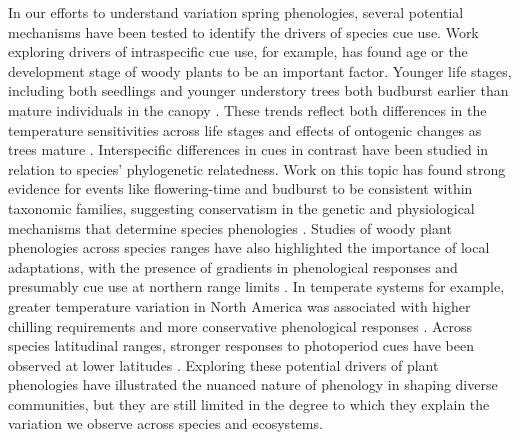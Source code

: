 \documentclass{article}\usepackage[]{graphicx}\usepackage[]{color}
\begin{document}
In our efforts to understand variation spring phenologies, several potential mechanisms have been tested to identify the drivers of species cue use. Work exploring drivers of intraspecific cue use, for example, has found age or the development stage of woody plants to be an important factor. Younger life stages, including both seedlings and younger understory trees both budburst earlier than mature individuals in the canopy \citep{Vitasse2013,Seiwa1991}. These trends reflect both differences in the temperature sensitivities across life stages and effects of ontogenic changes as trees mature \citep{Vitasse2013,Seiwa1991}. Interspecific differences in cues in contrast have been studied in relation to species' phylogenetic relatedness. Work on this topic has found strong evidence for events like flowering-time and budburst to be consistent within taxonomic families, suggesting conservatism in the genetic and physiological mechanisms that determine species phenologies \citep{Kochmer1986,Davies2013,Gougherty2018}. Studies of woody plant phenologies across species ranges have also highlighted the importance of local adaptations, with the presence of gradients in phenological responses and presumably cue use at northern range limits \citep{Lechowicz1984,Chuine2001,Chuine2010}. In temperate systems for example, greater temperature variation in North America was associated with higher chilling requirements and more conservative phenological responses \citep{Zohner2017}.  Across species latitudinal ranges, stronger responses to photoperiod cues have been observed at lower latitudes \citep{Zohner2016}. Exploring these potential drivers of plant phenologies have illustrated the nuanced nature of phenology in shaping diverse communities, but they are still limited in the degree to which they explain the variation we observe across species and ecosystems.
\end{document}
